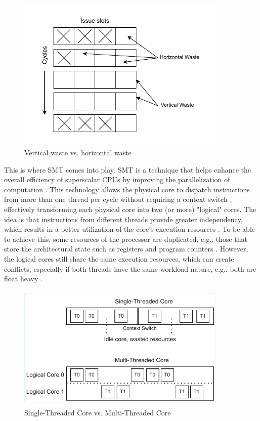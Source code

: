 \begin{figure}[H]
    \centering
    \includegraphics[width=10cm, height=7.5cm]{figures/cpu_wastages}
    \hspace{-2.5cm}
    \caption{Vertical waste vs. horizontal waste}
    \label{fig:cpu}
\end{figure}
\noindent
This is where \acl{SMT} comes into play. \acs{SMT} is a technique that helps enhance the overall efficiency of superscalar CPUs 
by improving the parallelization of computation \cite{SMT_under_the_hood}. This technology allows the 
physical core to dispatch instructions from more than one thread per cycle without requiring 
a context switch \cite{SMT_Maximizing_on_chip_parallelism}, effectively transforming each physical core into two (or more) "logical" cores. The idea is that instructions from different
threads provide greater independency, which results in a better utilization of the core's execution 
resources \cite{SMT_under_the_hood}.
To be able to achieve this, some resources of the processor are duplicated, 
e.g., those that store the architectural state such as registers and program 
counters \cite{SMT_under_the_hood}. However, the logical 
cores still share the same execution resources, which can create conflicts, especially if both threads have 
the same workload nature, e.g., both are float heavy \cite{SMT_modeling_resource_contention}. 
\begin{figure}[H]
    \centering
    \hspace*{-2cm} 
    \includegraphics[width=10cm, height=6cm]{figures/single_vs_multithreaded}
    \caption{Single-Threaded Core vs. Multi-Threaded Core}
    \label{fig:all}
\end{figure}
